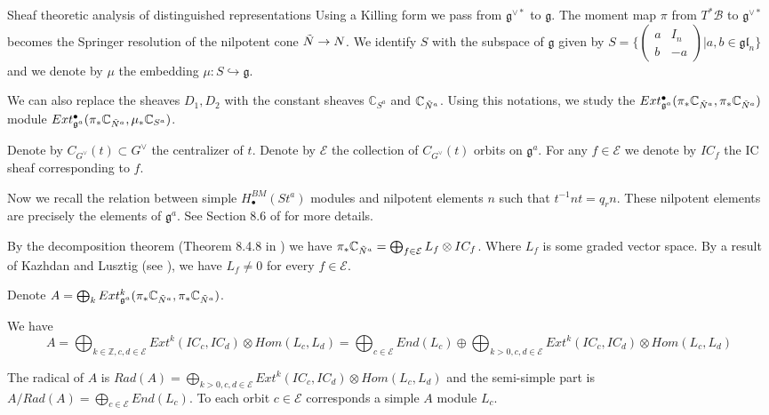 \documentclass[12pt]{article}
\newcommand{\B}{\mathcal{B}}
\newcommand{\C}{\mathbb{C}}
\newcommand{\Z}{\mathbb{Z}}
\newcommand{\<}{\langle}
\renewcommand{\>}{\rangle}
\theoremstyle{plain}
\theoremstyle{definition}
\begin{document}
\begin{section}{Sheaf theoretic analysis of distinguished representations}
Using a Killing form we pass from $\mathfrak{g}^{\vee*}$ to $\mathfrak{g}$. The moment map $\pi$ from $T^*\B$ to $\mathfrak{g}^{\vee*}$ becomes the Springer resolution of the nilpotent cone $\Tilde{N}\rightarrow N$. We identify $S$ with the subspace of $\mathfrak{g}$ given by $S=\{\begin{pmatrix}
        a & I_n  \\
        b & -a
        \end{pmatrix}|a,b\in \mathfrak{gl}_n\}$ and we denote by $\mu$ the embedding $\mu:S\hookrightarrow \mathfrak{g}$.

We can also replace the sheaves $D_1,D_2$ with the constant sheaves $\C_{S^a}$ and $\C_{\Tilde{N}^a}$. 
Using this notations, we study the $Ext^\bullet_{\mathfrak{g}^a}(\pi_*\C_{\Tilde{N}^a},\pi_*\C_{\Tilde{N}^a})$ module $Ext^\bullet_{\mathfrak{g}^a}(\pi_*\C_{\Tilde{N}^a},\mu_*\C_{S^a})$.


Denote by $C_{G^\vee}(t)\subset G^\vee$ the centralizer of $t$. Denote by $\mathcal{E}$ the collection of $C_{G^\vee}(t)$ orbits on $\mathfrak{g}^a$. For any $f\in \mathcal{E}$ we denote by $IC_f$ the IC sheaf corresponding to $f$.

Now we recall the relation between simple $H^{BM}_\bullet(St^a)$ modules and nilpotent elements $n$ such that $t^{-1}nt=q_rn$. These nilpotent elements are precisely the elements of $\mathfrak{g}^a$. See Section 8.6 of \cite{Chriss1997RepresentationTA} for more details.



By the decomposition theorem (Theorem 8.4.8 in \cite{Chriss1997RepresentationTA}) we have $\pi_*\C_{\Tilde{N}^a}=\bigoplus_{f\in \mathcal{E}}L_f\otimes IC_f$. Where $L_f$ is some graded vector space. By a result of Kazhdan and Lusztig (see \cite{Kazhdan1987ProofOT}), we have $L_f\neq 0$ for every $f\in\mathcal{E}$.

Denote $A=\bigoplus_k Ext^k_{\mathfrak{g}^a}(\pi_*\C_{\Tilde{N}^a},\pi_*\C_{\Tilde{N}^a})$.

We have $$A=\bigoplus_{k\in \Z,c,d\in\mathcal{E}}Ext^k(IC_c,IC_d)\otimes Hom(L_c,L_d)=\bigoplus_{c\in \mathcal{E}}End(L_c)\oplus\bigoplus_{k>0,c,d\in\mathcal{E}}Ext^k(IC_c,IC_d)\otimes Hom(L_c,L_d)$$ 

The radical of $A$ is $Rad(A)=\bigoplus_{k>0,c,d\in\mathcal{E}}Ext^k(IC_c,IC_d)\otimes Hom(L_c,L_d)$ and the semi-simple part is $A/Rad(A)=\bigoplus_{c\in \mathcal{E}}End(L_c)$. To each orbit $c\in \mathcal{E}$ corresponds a simple $A$ module $L_c$. 


\end{section}
\end{document}
